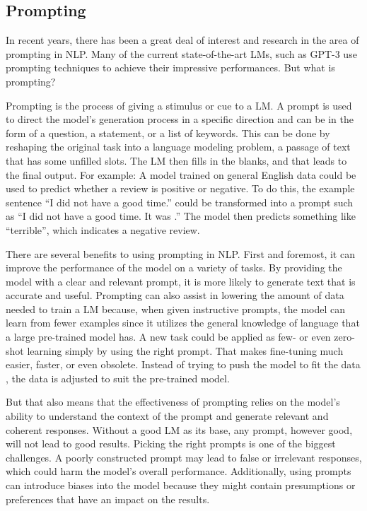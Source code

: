 \subsection{Prompting}

In recent years, there has been a great deal of interest and research in the area of prompting in NLP. Many of the current state-of-the-art LMs, such as GPT-3 \citep{brown2020gpt3} use prompting techniques to achieve their impressive performances. But what is prompting?

Prompting is the process of giving a stimulus or cue to a LM. A prompt is used to direct the model's generation process in a specific direction and can be in the form of a question, a statement, or a list of keywords. This can be done by reshaping the original task into a language modeling problem, a passage of text that has some unfilled slots. The LM then fills in the blanks, and that leads to the final output. For example: A model trained on general English data could be used to predict whether a review is positive or negative. To do this, the example sentence ``I did not have a good time.'' could be transformed into a prompt such as ``I did not have a good time. It was \underline{\hspace{1cm}}.'' The model then predicts something like ``terrible'', which indicates a negative review.

There are several benefits to using prompting in NLP. First and foremost, it can improve the performance of the model on a variety of tasks. By providing the model with a clear and relevant prompt, it is more likely to generate text that is accurate and useful. Prompting can also assist in lowering the amount of data needed to train a LM because, when given instructive prompts, the model can learn from fewer examples since it utilizes the general knowledge of language that a large pre-trained model has. A new task could be applied as few- or even zero-shot learning simply by using the right prompt. That makes fine-tuning much easier, faster, or even obsolete. Instead of trying to push the model to fit the data , the data is adjusted to suit the pre-trained model.

But that also means that the effectiveness of prompting relies on the model's ability to understand the context of the prompt and generate relevant and coherent responses. Without a good LM as its base, any prompt, however good, will not lead to good results. Picking the right prompts is one of the biggest challenges. A poorly constructed prompt may lead to false or irrelevant responses, which could harm the model's overall performance. Additionally, using prompts can introduce biases into the model because they might contain presumptions or preferences that have an impact on the results.

